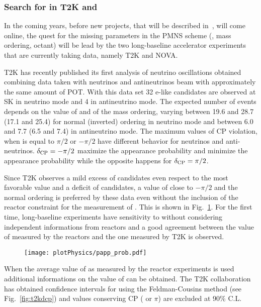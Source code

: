 \subsubsection{Search for \dcp in T2K and \nova}
In the coming years, before new projects, that will be described in~\cite{sec:future}, will come online, the quest for the missing parameters in the PMNS scheme (\dcp, mass ordering, \thatm octant) will be lead by the two long-baseline accelerator experiments that are currently taking data, namely T2K and NOVA.

T2K has recently published its first analysis of neutrino oscillations obtained combining data taken with neutrinos and antineutrinos beam with approximately the same amount of POT. With this data set 32 e-like candidates are observed at SK in neutrino mode and 4 in antineutrino mode. The expected number of events depends on the value of \dcp and of the mass ordering, varying between 19.6 and 28.7 (17.1 and 25.4) for normal (inverted) ordering in neutrino mode and between 6.0 and 7.7 (6.5 and 7.4) in antineutrino mode. The maximum values of CP violation, when \dcp is equal to $\pi/2$ or $-\pi/2$ have different behavior for neutrinos and anti-neutrinos. $\delta_{\mathrm{CP}}=-\pi/2$ maximize the \nue appearance probability and minimize the \nueb appearance probability while the opposite happens for $\delta_{\mathrm{CP}}=\pi/2$. 

Since T2K observes a mild excess of \nue candidates even respect to the most favorable value and a deficit of \nueb candidates, a value of \dcp close to $-\pi/2$ and the normal ordering is preferred by these data even without the inclusion of the reactor constraint for the measurement of \thint. This is shown in Fig.~\ref{fig:t2kjoint}. For the first time, long-baseline experiments have sensitivity to \dcp without considering independent informations from reactors and a good agreement between the value of \thint measured by the reactors and the one measured by T2K is observed. 

\begin{figure} [h!]
\begin{center}
\texttt{[image: plotPhysics/papp\_prob.pdf]}
\caption{\label{fig:t2kjoint}  }
\end{center}
\end{figure}


When the average value of \thint as measured by the reactor experiments is used additional informations on the value of \dcp can be obtained. The T2K collaboration has obtained confidence intervals for \dcp using the Feldman-Cousins method (see Fig.~\ref{fig:t2kdcp}) and values conserving CP ( or $\pi$) are excluded at 90\% C.L.

